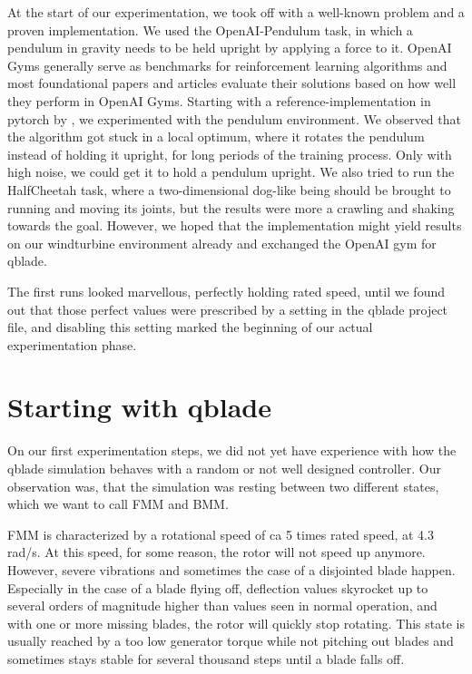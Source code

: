 \documentclass[hyperref,german,beleg]{cgvpub}
\begin{document}
At the start of our experimentation, we took off with a well-known problem and a proven implementation. We used the OpenAI-Pendulum task, in which a pendulum in gravity needs to be held upright by applying a force to it. OpenAI Gyms generally serve as benchmarks for reinforcement learning algorithms and most foundational papers and articles evaluate their solutions based on how well they perform in OpenAI Gyms. Starting with a reference-implementation in pytorch by \cite{DeepDeterministicPolicy}, we experimented with the pendulum environment. We observed that the algorithm got stuck in a local optimum, where it rotates the pendulum instead of holding it upright, for long periods of the training process. Only with high noise, we could get it to hold a pendulum upright. We also tried to run the HalfCheetah task, where a two-dimensional dog-like being should be brought to running and moving its joints, but the results were more a crawling and shaking towards the goal. However, we hoped that the implementation might yield results on our windturbine environment already and exchanged the OpenAI gym for qblade.

The first runs looked marvellous, perfectly holding rated speed, until we found out that those perfect values were prescribed by a setting in the qblade project file, and disabling this setting marked the beginning of our actual experimentation phase.

\section{Starting with qblade}

On our first experimentation steps, we did not yet have experience with how the qblade simulation behaves with a random or not well designed controller. Our observation was, that the simulation was resting between two different states, which we want to call \ac{FMM} and \ac{BMM}.

\ac{FMM} is characterized by a rotational speed of ca 5 times rated speed, at 4.3 rad/s. At this speed, for some reason, the rotor will not speed up anymore. However, severe vibrations and sometimes the case of a disjointed blade happen. Especially in the case of a blade flying off, deflection values skyrocket up to several orders of magnitude higher than values seen in normal operation, and with one or more missing blades, the rotor will quickly stop rotating. This state is usually reached by a too low generator torque while not pitching out blades and sometimes stays stable for several thousand steps until a blade falls off.
\end{document}
